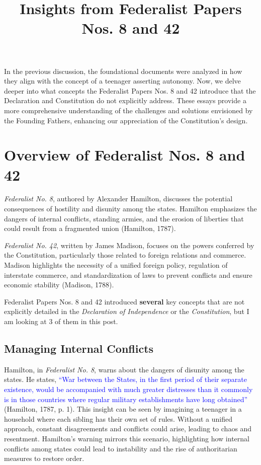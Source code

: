 \documentclass[12pt]{article}
\title{\textbf{Insights from Federalist Papers Nos. 8 and 42}}
\author{}
\date{}
\begin{document}
\maketitle


In the previous discussion, the foundational documents were analyzed in how they align with the concept of a teenager asserting autonomy. Now, we delve deeper into what concepts the Federalist Papers Nos. 8 and 42 introduce that the Declaration and Constitution do not explicitly address. These essays provide a more comprehensive understanding of the challenges and solutions envisioned by the Founding Fathers, enhancing our appreciation of the Constitution’s design.

\section{Overview of Federalist Nos. 8 and 42}

\textit{Federalist No. 8}, authored by Alexander Hamilton, discusses the potential consequences of hostility and disunity among the states. Hamilton emphasizes the dangers of internal conflicts, standing armies, and the erosion of liberties that could result from a fragmented union (Hamilton, 1787).

\textit{Federalist No. 42}, written by James Madison, focuses on the powers conferred by the Constitution, particularly those related to foreign relations and commerce. Madison highlights the necessity of a unified foreign policy, regulation of interstate commerce, and standardization of laws to prevent conflicts and ensure economic stability (Madison, 1788).

 Federalist Papers Nos. 8 and 42 introduced \textbf{several} key concepts that are not explicitly detailed in the \textit{Declaration of Independence} or the \textit{Constitution}, but I am looking at 3 of them in this post.

\subsection{Managing Internal Conflicts}

Hamilton, in \textit{Federalist No. 8}, warns about the dangers of disunity among the states. He states, \textcolor{blue}{“War between the States, in the first period of their separate existence, would be accompanied with much greater distresses than it commonly is in those countries where regular military establishments have long obtained”} (Hamilton, 1787, p. 1). This insight can be seen by imagining a teenager in a household where each sibling has their own set of rules. Without a unified approach, constant disagreements and conflicts could arise, leading to chaos and resentment. Hamilton’s warning mirrors this scenario, highlighting how internal conflicts among states could lead to instability and the rise of authoritarian measures to restore order. 
\end{document}
